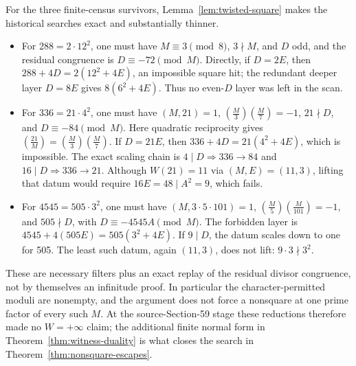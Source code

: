 \documentclass[10pt,reqno]{amsart}
\theoremstyle{definition}
\newcommand{\1}{\mathbf 1}
\begin{document}
For the three finite-census survivors, Lemma~\ref{lem:twisted-square} makes
the historical searches exact and substantially thinner.
\begin{itemize}[leftmargin=*]
\item For $288=2\cdot12^2$, one must have $M\equiv3\pmod8$,
$3\nmid M$, and $D$ odd, and the residual congruence is
$D\equiv-72\pmod M$.  Directly, if $D=2E$, then
$288+4D=2(12^2+4E)$, an impossible square hit; the redundant deeper layer
$D=8E$ gives $8(6^2+4E)$.  Thus no even-$D$ layer was left in the scan.
\item For $336=21\cdot4^2$, one must have $(M,21)=1$,
$\left(\frac M3\right)\left(\frac M7\right)=-1$,
$21\nmid D$, and $D\equiv-84\pmod M$.  Here quadratic reciprocity gives
$\left(\frac {21}M\right)=
 \left(\frac M3\right)\left(\frac M7\right)$.  If $D=21E$, then
$336+4D=21(4^2+4E)$, which is impossible.  The exact scaling chain is
$4\mid D\Rightarrow336\to84$ and $16\mid D\Rightarrow336\to21$.
Although $W(21)=11$ via $(M,E)=(11,3)$, lifting that datum would require
$16E=48\mid A^2=9$, which fails.
\item For $4545=505\cdot3^2$, one must have
$(M,3\cdot5\cdot101)=1$,
$\left(\frac M5\right)\left(\frac M{101}\right)=-1$, and
$505\nmid D$, with $D\equiv-4545A\pmod M$.  The forbidden layer is
$4545+4(505E)=505(3^2+4E)$.  If $9\mid D$, the datum scales down to one for
505.  The least such datum, again $(11,3)$, does not lift:
$9\cdot3\nmid3^2$.
\end{itemize}
These are necessary filters plus an exact replay of the residual divisor
congruence, not by themselves an infinitude proof.  In particular the
character-permitted moduli are nonempty, and the argument does not force a
nonsquare at one prime factor of every such $M$.  At the source-Section-59
stage these reductions therefore made no $W=+\infty$ claim; the additional
finite normal form in Theorem~\ref{thm:witness-duality} is what closes the
search in Theorem~\ref{thm:nonsquare-escapes}.
\end{document}
